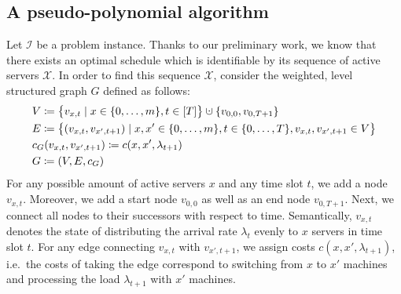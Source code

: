 \documentclass[hidelinks]{article}
\theoremstyle{plain}
\theoremstyle{definition}
\theoremstyle{rem}
\newcommand{\mx}{\mathcal{X}}
\newcommand{\inp}{\mathcal{I}}
\newcommand{\costs}{c}
\newcommand{\fromto}[2]{\{#1,\ldots,#2\}}
\newcommand{\dotcup}{\mathbin{\mathaccent\cdot\cup}}
\begin{document}
\subsection{A pseudo-polynomial algorithm}\label{sec_opt_offline_pseudo_poly}
Let $\inp$ be a problem instance. Thanks to our preliminary work, we know that there exists an optimal schedule which is identifiable by its sequence of active servers $\mx$. In order to find this sequence $\mx$, consider the weighted, level structured graph $G$ defined as follows:
\begin{align*}
	&V\coloneqq\bigl\{v_{x,t}\mid x\in\fromto{0}{m},t\in[T]\bigr\}\dotcup\{v_{0,0},v_{0,T+1}\}\\
	&E\coloneqq\bigl\{(v_{x,t},v_{x',t+1})\mid x,x'\in\fromto{0}{m},t\in\fromto{0}{T},v_{x,t},v_{x',t+1}\in V\bigr\}\\
	&c_G(v_{x,t},v_{x',t+1})\coloneqq\costs(x,x',\lambda_{t+1})\\
	&G\coloneqq(V,E,c_G)
\end{align*}
For any possible amount of active servers $x$ and any time slot $t$, we add a node $v_{x,t}$. Moreover, we add a start node $v_{0,0}$ as well as an end node $v_{0,T+1}$. Next, we connect all nodes to their successors with respect to time. Semantically, $v_{x,t}$ denotes the state of distributing the arrival rate $\lambda_{t}$ evenly to $x$ servers in time slot $t$. For any edge connecting $v_{x,t}$ with $v_{x',t+1}$, we assign costs $\costs(x,x',\lambda_{t+1})$, i.e.\ the costs of taking the edge correspond to switching from $x$ to $x'$ machines and processing the load $\lambda_{t+1}$ with $x'$ machines.
\end{document}
